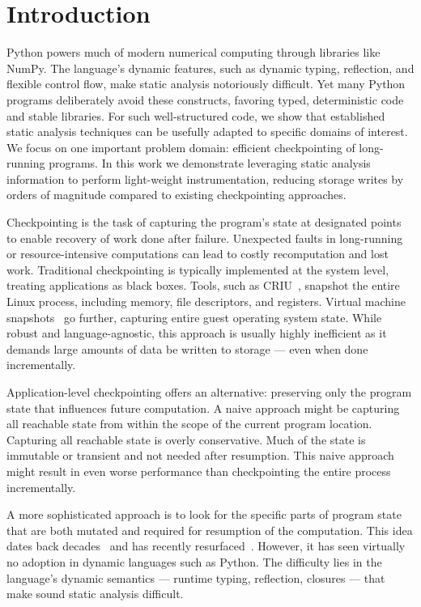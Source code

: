 \section{Introduction}
Python powers much of modern numerical computing through libraries like NumPy. The language’s dynamic features, such as dynamic typing, reflection, and flexible control flow, make static analysis notoriously difficult. Yet many Python programs deliberately avoid these constructs, favoring typed, deterministic code and stable libraries. For such well-structured code, we show that established static analysis techniques can be usefully adapted to specific domains of interest. We focus on one important problem domain: efficient checkpointing of long-running programs. 
In this work we demonstrate leveraging static analysis information to perform light-weight instrumentation, reducing storage writes by orders of magnitude compared to existing checkpointing approaches.

Checkpointing is the task of capturing the program’s state at designated points to enable recovery of work done after failure. Unexpected faults in long-running or resource-intensive computations can lead to costly recomputation and lost work. Traditional checkpointing is typically implemented at the system level, treating applications as black boxes. Tools, such as CRIU~\cite{CRIUProject}, snapshot the entire Linux process, including memory, file descriptors, and registers. Virtual machine snapshots~\cite{VMwareSnapshot, RedHatVMSnapshot} go further, capturing entire guest operating system state. While robust and language-agnostic, this approach is usually highly inefficient as it demands large amounts of data be written to storage --- even when done incrementally.

Application-level checkpointing offers an alternative: preserving only the program state that influences future computation. A naive approach might be capturing all reachable state from within the scope of the current program location. Capturing all reachable state is overly conservative. Much of the state is immutable or transient and not needed after resumption.  This naive approach might result in even worse performance than checkpointing the entire process incrementally.

A more sophisticated approach is to look for the specific parts of program state that are both mutated and required for resumption of the computation. This idea dates back decades~\cite{li1990catch} and has recently resurfaced~\cite{kim2024lact}. However, it has seen virtually no adoption in dynamic languages such as Python. The difficulty lies in the language’s dynamic semantics --- runtime typing, reflection, closures --- that make sound static analysis difficult.

